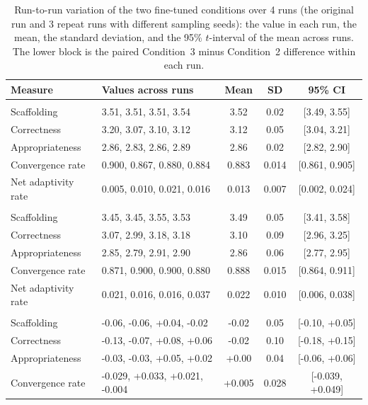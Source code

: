 \begin{table}[h]
  \centering
  \caption{Run-to-run variation of the two fine-tuned conditions over 4 runs (the original run and 3 repeat runs with different sampling seeds): the value in each run, the mean, the standard deviation, and the 95\% $t$-interval of the mean across runs. The lower block is the paired Condition~3 minus Condition~2 difference within each run.}
  \label{tab:repeated-runs}
  \footnotesize
  \setlength{\tabcolsep}{4pt}
  \begin{tabularx}{\linewidth}{@{}>{\raggedright\arraybackslash}lXccc@{}}
    \toprule
    Measure & Values across runs & Mean & SD & 95\% CI \\
    \midrule
    \multicolumn{5}{@{}l}{\emph{Condition~2 (state suppressed)}} \\
    Scaffolding & 3.51, 3.51, 3.51, 3.54 & 3.52 & 0.02 & [3.49, 3.55] \\
    Correctness & 3.20, 3.07, 3.10, 3.12 & 3.12 & 0.05 & [3.04, 3.21] \\
    Appropriateness & 2.86, 2.83, 2.86, 2.89 & 2.86 & 0.02 & [2.82, 2.90] \\
    Convergence rate & 0.900, 0.867, 0.880, 0.884 & 0.883 & 0.014 & [0.861, 0.905] \\
    Net adaptivity rate & 0.005, 0.010, 0.021, 0.016 & 0.013 & 0.007 & [0.002, 0.024] \\
    \midrule
    \multicolumn{5}{@{}l}{\emph{Condition~3 (state-conditioned)}} \\
    Scaffolding & 3.45, 3.45, 3.55, 3.53 & 3.49 & 0.05 & [3.41, 3.58] \\
    Correctness & 3.07, 2.99, 3.18, 3.18 & 3.10 & 0.09 & [2.96, 3.25] \\
    Appropriateness & 2.85, 2.79, 2.91, 2.90 & 2.86 & 0.06 & [2.77, 2.95] \\
    Convergence rate & 0.871, 0.900, 0.900, 0.880 & 0.888 & 0.015 & [0.864, 0.911] \\
    Net adaptivity rate & 0.021, 0.016, 0.016, 0.037 & 0.022 & 0.010 & [0.006, 0.038] \\
    \midrule
    \multicolumn{5}{@{}l}{\emph{Condition~3 minus Condition~2 (paired within each run)}} \\
    Scaffolding & -0.06, -0.06, +0.04, -0.02 & -0.02 & 0.05 & [-0.10, +0.05] \\
    Correctness & -0.13, -0.07, +0.08, +0.06 & -0.02 & 0.10 & [-0.18, +0.15] \\
    Appropriateness & -0.03, -0.03, +0.05, +0.02 & +0.00 & 0.04 & [-0.06, +0.06] \\
    Convergence rate & -0.029, +0.033, +0.021, -0.004 & +0.005 & 0.028 & [-0.039, +0.049] \\
    \bottomrule
  \end{tabularx}
\end{table}
